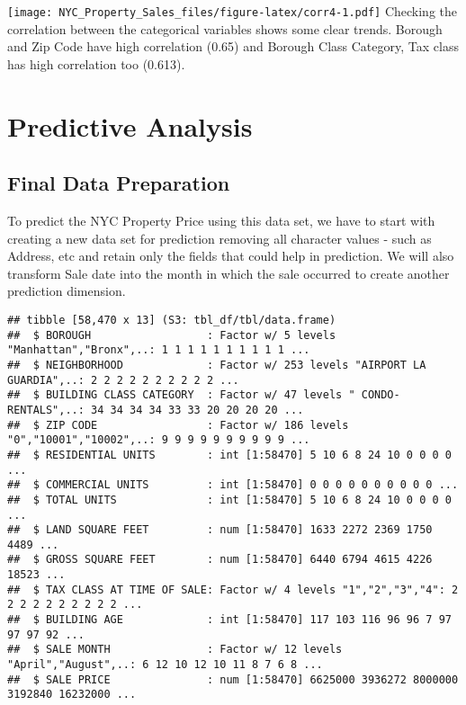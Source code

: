 \documentclass[
  a3paper,
]{article}
\begin{document}
\texttt{[image: NYC\_Property\_Sales\_files/figure-latex/corr4-1.pdf]}
Checking the correlation between the categorical variables shows some
clear trends. Borough and Zip Code have high correlation (0.65) and
Borough Class Category, Tax class has high correlation too (0.613).

\newpage

\hypertarget{predictive-analysis}{%
\section{\texorpdfstring{\textbf{Predictive
Analysis}}{Predictive Analysis}}\label{predictive-analysis}}

\hypertarget{final-data-preparation}{%
\subsection{\texorpdfstring{\textbf{Final Data
Preparation}}{Final Data Preparation}}\label{final-data-preparation}}

To predict the NYC Property Price using this data set, we have to start
with creating a new data set for prediction removing all character
values - such as Address, etc and retain only the fields that could help
in prediction. We will also transform Sale date into the month in which
the sale occurred to create another prediction dimension.

\begin{verbatim}
## tibble [58,470 x 13] (S3: tbl_df/tbl/data.frame)
##  $ BOROUGH                  : Factor w/ 5 levels "Manhattan","Bronx",..: 1 1 1 1 1 1 1 1 1 1 ...
##  $ NEIGHBORHOOD             : Factor w/ 253 levels "AIRPORT LA GUARDIA",..: 2 2 2 2 2 2 2 2 2 2 ...
##  $ BUILDING CLASS CATEGORY  : Factor w/ 47 levels " CONDO-RENTALS",..: 34 34 34 34 33 33 20 20 20 20 ...
##  $ ZIP CODE                 : Factor w/ 186 levels "0","10001","10002",..: 9 9 9 9 9 9 9 9 9 9 ...
##  $ RESIDENTIAL UNITS        : int [1:58470] 5 10 6 8 24 10 0 0 0 0 ...
##  $ COMMERCIAL UNITS         : int [1:58470] 0 0 0 0 0 0 0 0 0 0 ...
##  $ TOTAL UNITS              : int [1:58470] 5 10 6 8 24 10 0 0 0 0 ...
##  $ LAND SQUARE FEET         : num [1:58470] 1633 2272 2369 1750 4489 ...
##  $ GROSS SQUARE FEET        : num [1:58470] 6440 6794 4615 4226 18523 ...
##  $ TAX CLASS AT TIME OF SALE: Factor w/ 4 levels "1","2","3","4": 2 2 2 2 2 2 2 2 2 2 ...
##  $ BUILDING AGE             : int [1:58470] 117 103 116 96 96 7 97 97 97 92 ...
##  $ SALE MONTH               : Factor w/ 12 levels "April","August",..: 6 12 10 12 10 11 8 7 6 8 ...
##  $ SALE PRICE               : num [1:58470] 6625000 3936272 8000000 3192840 16232000 ...
\end{verbatim}
\end{document}
